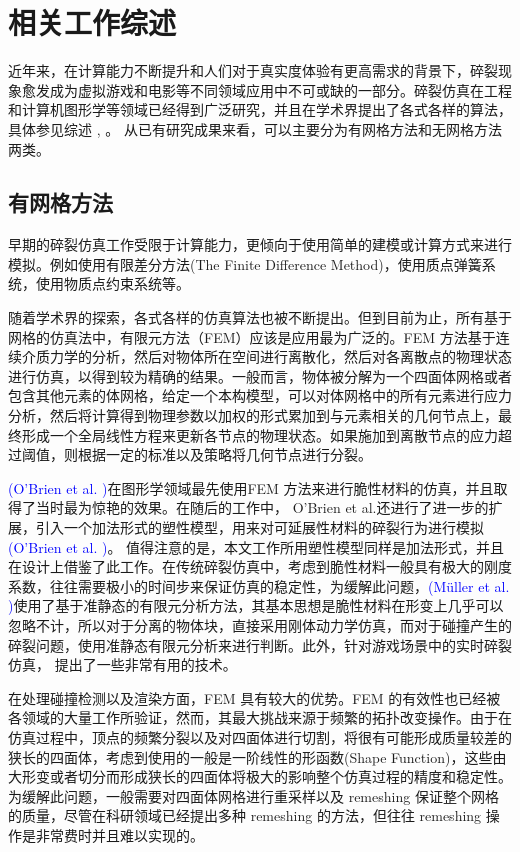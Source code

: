 \section{相关工作综述}
\label{related_work}
近年来，在计算能力不断提升和人们对于真实度体验有更高需求的背景下，碎裂现象愈发成为虚拟游戏和电影等不同领域应用中不可或缺的一部分。碎裂仿真在工程和计算机图形学等领域已经得到广泛研究，并且在学术界提出了各式各样的算法，具体参见综述 , 。 从已有研究成果来看，可以主要分为有网格方法和无网格方法两类。

\subsection{有网格方法}

早期的碎裂仿真工作受限于计算能力，更倾向于使用简单的建模或计算方式来进行模拟。例如使用有限差分方法(The Finite Difference Method)，使用质点弹簧系统，使用物质点约束系统等。

随着学术界的探索，各式各样的仿真算法也被不断提出。但到目前为止，所有基于网格的仿真法中，有限元方法（FEM）应该是应用最为广泛的。FEM 方法基于连续介质力学的分析，然后对物体所在空间进行离散化，然后对各离散点的物理状态进行仿真，以得到较为精确的结果。一般而言，物体被分解为一个四面体网格或者包含其他元素的体网格，给定一个本构模型，可以对体网格中的所有元素进行应力分析，然后将计算得到物理参数以加权的形式累加到与元素相关的几何节点上，最终形成一个全局线性方程来更新各节点的物理状态。如果施加到离散节点的应力超过阈值，则根据一定的标准以及策略将几何节点进行分裂。

\textcolor{blue}{(O'Brien et al. )\parencite{OBrien1999}}在图形学领域最先使用FEM 方法来进行脆性材料的仿真，并且取得了当时最为惊艳的效果。在随后的工作中， O'Brien et al.还进行了进一步的扩展，引入一个加法形式的塑性模型，用来对可延展性材料的碎裂行为进行模拟\textcolor{blue}{(O'Brien et al. )\parencite{OBrien2002}}。 值得注意的是，本文工作所用塑性模型同样是加法形式，并且在设计上借鉴了此工作。在传统碎裂仿真中，考虑到脆性材料一般具有极大的刚度系数，往往需要极小的时间步来保证仿真的稳定性，为缓解此问题，\textcolor{blue}{(M\"{u}ller et al. )\parencite{Muller2001}}使用了基于准静态的有限元分析方法，其基本思想是脆性材料在形变上几乎可以忽略不计，所以对于分离的物体块，直接采用刚体动力学仿真，而对于碰撞产生的碎裂问题，使用准静态有限元分析来进行判断。此外，针对游戏场景中的实时碎裂仿真， 提出了一些非常有用的技术。

在处理碰撞检测以及渲染方面，FEM 具有较大的优势。FEM 的有效性也已经被各领域的大量工作所验证，然而，其最大挑战来源于频繁的拓扑改变操作。由于在仿真过程中，顶点的频繁分裂以及对四面体进行切割，将很有可能形成质量较差的狭长的四面体，考虑到使用的一般是一阶线性的形函数(Shape Function)，这些由大形变或者切分而形成狭长的四面体将极大的影响整个仿真过程的精度和稳定性。为缓解此问题，一般需要对四面体网格进行重采样以及 remeshing 保证整个网格的质量，尽管在科研领域已经提出多种 remeshing 的方法，但往往 remeshing 操作是非常费时并且难以实现的。

